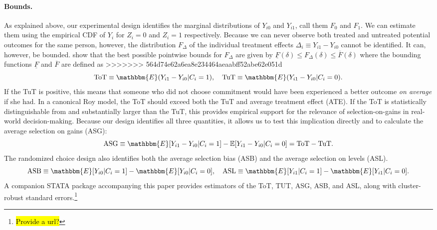 \documentclass[oneside,11pt]{article}
\begin{document}
{\paragraph{Bounds.} As explained above, our experimental design identifies the marginal distributions of $Y_{i0}$ and $Y_{i1}$, call them $F_0$ and $F_1$. We can estimate them using the empirical CDF of $Y_i$ for $Z_i=0$ and $Z_i = 1$ respectively. Because we can never observe both treated and untreated potential outcomes for the same person, however, the distribution $F_\Delta$ of the individual treatment effects $\Delta_i \equiv Y_{i1} - Y_{i0}$ cannot be identified. It can, however, be bounded. \cite{fan2010sharp} show that the best possible pointwise bounds for $F_\Delta$ are given by $\underline{F}(\delta) \leq F_\Delta(\delta) \leq \overline{F}(\delta)$ where the bounding functions $\underline{F}$ and $\overline{F}$ are defined as 
>>>>>>> 564d74e62a6ea8e234464aeaabff52abe62e051d
\[
\text{ToT} \equiv \mathbbm{E}(Y_{i1} - Y_{i0} | C_i = 1), \quad
\text{TuT} \equiv \mathbbm{E}(Y_{i1} - Y_{i0} | C_i = 0).
\]
If the TuT is positive, this means that someone who did not choose commitment would have been experienced a better outcome \emph{on average} if she had. 
In a canonical Roy model, the ToT should exceed both the TuT and average treatment effect (ATE).
If the ToT is statistically distinguishable from and substantially larger than the TuT, this provides empirical support for the relevance of selection-on-gains in real-world decision-making.
Because our design identifies all three quantities, it allows us to test this implication directly and to calculate the average selection on gains (ASG):
\[
\text{ASG} \equiv \mathbbm{E}[Y_{i1} - Y_{i0}|C_i = 1] - \mathbb{E}[Y_{i1} - Y_{i0} | C_i = 0] = \text{ToT} - \text{TuT}.
\]
The randomized choice design also identifies both the average selection bias (ASB) and the average selection on levels (ASL). 
\[
\text{ASB} \equiv \mathbbm{E}[Y_{i0}|C_i = 1] - \mathbbm{E}[Y_{i0}|C_i = 0], \quad 
\text{ASL} \equiv \mathbbm{E}[Y_{i1}|C_i = 1] - \mathbbm{E}[Y_{i1}|C_i = 0].
\]
A companion STATA package accompanying this paper provides estimators of the ToT, TUT, ASG, ASB, and ASL, along with cluster-robust standard errors.\footnote{\hl{Provide a url?}}

}
\end{document}
